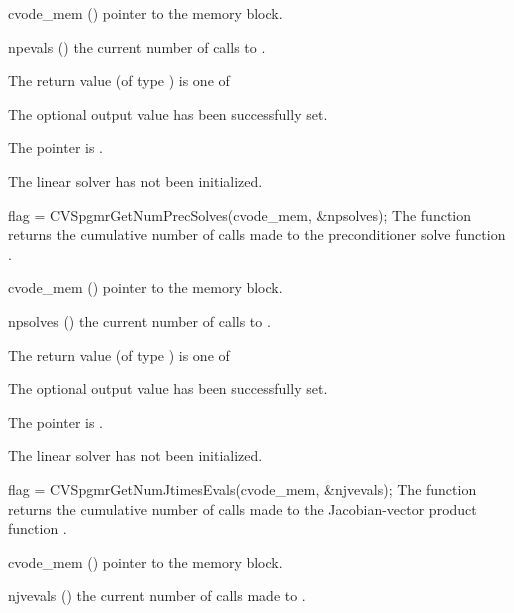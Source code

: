 {
  \begin{args}
  \item[cvode\_mem] ()
    pointer to the {\cvodes} memory block.
  \item[npevals] ()
    the current number of calls to .
  \end{args}
}
{
  The return value  (of type ) is one of
  \begin{args}
  \item[\Id{CVSPGMR\_SUCCESS}] 
    The optional output value has been successfully set.
  \item[\Id{CVSPGMR\_MEM\_NULL}]
    The  pointer is .
  \item[\Id{CVSPGMR\_LMEM\_NULL}]
    The {\cvspgmr} linear solver has not been initialized.
  \end{args}
}
{}
{
  flag = CVSpgmrGetNumPrecSolves(cvode\_mem, \&npsolves);
}
{
  The function  returns the
  cumulative number of calls made to the preconditioner 
  solve function .
}
{
  \begin{args}
  \item[cvode\_mem] ()
    pointer to the {\cvodes} memory block.
  \item[npsolves] ()
    the current number of calls to .
  \end{args}
}
{
  The return value  (of type ) is one of
  \begin{args}
  \item[\Id{CVSPGMR\_SUCCESS}] 
    The optional output value has been successfully set.
  \item[\Id{CVSPGMR\_MEM\_NULL}]
    The  pointer is .
  \item[\Id{CVSPGMR\_LMEM\_NULL}]
    The {\cvspgmr} linear solver has not been initialized.
  \end{args}
}
{}
{
  flag = CVSpgmrGetNumJtimesEvals(cvode\_mem, \&njvevals);
}
{
  The function  returns the
  cumulative number of calls made to the Jacobian-vector product function
  .
}
{
  \begin{args}
  \item[cvode\_mem] ()
    pointer to the {\cvodes} memory block.
  \item[njvevals] ()
    the current number of calls made to .
  \end{args}
}
